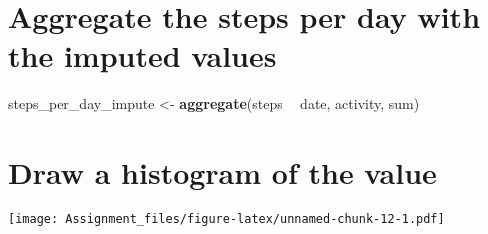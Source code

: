 \documentclass[
]{article}
\newenvironment{Shaded}{\begin{snugshade}}{\end{snugshade}}
\newcommand{\ControlFlowTok}[1]{\textcolor[rgb]{0.13,0.29,0.53}{\textbf{#1}}}
\newcommand{\DataTypeTok}[1]{\textcolor[rgb]{0.13,0.29,0.53}{#1}}
\newcommand{\DecValTok}[1]{\textcolor[rgb]{0.00,0.00,0.81}{#1}}
\newcommand{\KeywordTok}[1]{\textcolor[rgb]{0.13,0.29,0.53}{\textbf{#1}}}
\newcommand{\NormalTok}[1]{#1}
\newcommand{\OperatorTok}[1]{\textcolor[rgb]{0.81,0.36,0.00}{\textbf{#1}}}
\newcommand{\StringTok}[1]{\textcolor[rgb]{0.31,0.60,0.02}{#1}}
\begin{document}
\begin{Shaded}
\end{Shaded}

\hypertarget{aggregate-the-steps-per-day-with-the-imputed-values}{%
\section{Aggregate the steps per day with the imputed
values}\label{aggregate-the-steps-per-day-with-the-imputed-values}}

\begin{Shaded}
\begin{Highlighting}[]
\NormalTok{steps_per_day_impute <-}\StringTok{ }\KeywordTok{aggregate}\NormalTok{(steps }\OperatorTok{~}\StringTok{ }\NormalTok{date, activity, sum)}
\end{Highlighting}
\end{Shaded}

\hypertarget{draw-a-histogram-of-the-value}{%
\section{Draw a histogram of the
value}\label{draw-a-histogram-of-the-value}}

\begin{Shaded}
\end{Shaded}

\texttt{[image: Assignment\_files/figure-latex/unnamed-chunk-12-1.pdf]}
\end{document}
